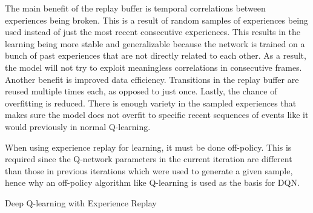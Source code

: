 \documentclass{article}
\begin{document}
The main benefit of the replay buffer is temporal correlations between experiences being broken. This is a result of random samples of experiences being used instead of just the most recent consecutive experiences. This results in the learning being more stable and generalizable because the network is trained on a bunch of past experiences that are not directly related to each other. As a result, the model will not try to exploit meaningless correlations in consecutive frames. Another benefit is improved data efficiency. Transitions in the replay buffer are reused multiple times each, as opposed to just once. Lastly, the chance of overfitting is reduced. There is enough variety in the sampled experiences that makes sure the model does not overfit to specific recent sequences of events like it would previously in normal Q-learning.

When using experience replay for learning, it must be done off-policy. This is required since the Q-network parameters in the current iteration are different than those in previous iterations which were used to generate a given sample, hence why an off-policy algorithm like Q-learning is used as the basis for DQN.

\begin{algorithm}
\caption{Deep Q-learning with Experience Replay\cite{dqn}}
\label{alg:DeepQlearningwithExperienceReplay}
\end{algorithm}
\end{document}
